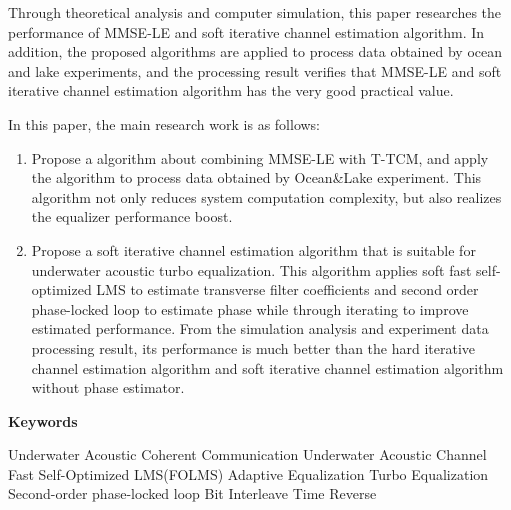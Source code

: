 Through theoretical analysis and computer simulation, this paper researches the performance of MMSE-LE and soft iterative channel estimation algorithm. In addition, the proposed algorithms are applied to process data obtained by ocean and lake experiments, and the processing result verifies that MMSE-LE and soft iterative channel estimation algorithm has the very good practical value.

In this paper, the main research work is as follows:
\begin{enumerate}
  \item
      Propose a algorithm about combining MMSE-LE with T-TCM, and apply the
      algorithm to process data obtained by Ocean\&Lake experiment. This algorithm not only reduces system computation complexity, but also realizes the equalizer performance boost.
  \item
      Propose a soft iterative channel estimation algorithm that is suitable for underwater acoustic turbo equalization. This algorithm applies soft fast self-optimized LMS to estimate transverse filter coefficients and second order phase-locked loop to estimate phase while through iterating to improve estimated performance. From the simulation analysis and experiment data processing result, its performance is much better than the hard iterative channel estimation algorithm and soft iterative channel estimation algorithm without phase estimator. 
\end{enumerate}

\vspace{1em}

\thispagestyle{plainabstracte}
\noindent\textbf{Keywords}

Underwater Acoustic Coherent Communication \quad Underwater Acoustic
Channel \quad Fast Self-Optimized LMS(FOLMS) \quad Adaptive Equalization
\quad Turbo Equalization \quad Second-order phase-locked loop \quad Bit
Interleave \quad Time Reverse
